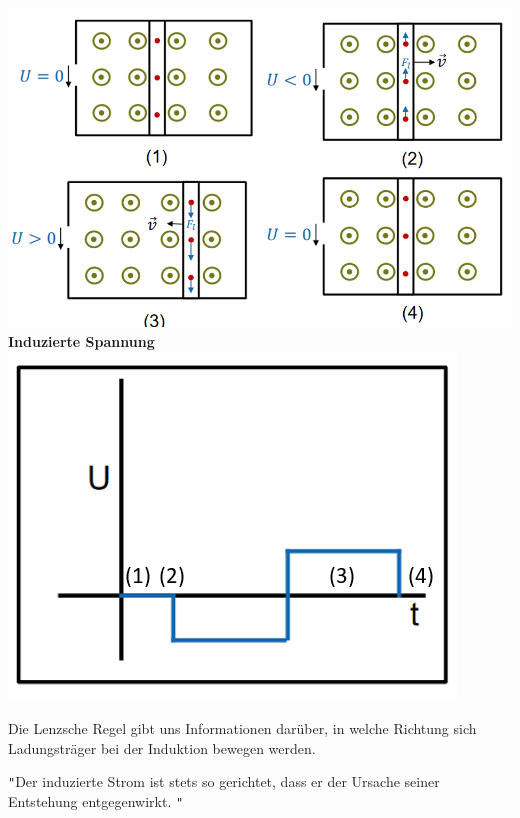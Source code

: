 \begin{center}
  \includegraphics[scale=0.4]{img/beweg-ind} \\
  \textbf{Induzierte Spannung} \\
    \includegraphics[scale=0.4]{img/beweg-ind-graph}
\end{center}



Die Lenzsche Regel gibt uns Informationen darüber, in welche Richtung sich Ladungsträger bei der Induktion bewegen werden.
\beginip
\begin{center}
  \texttt{"}Der induzierte Strom ist stets so gerichtet, dass er der Ursache seiner Entstehung entgegenwirkt.  \texttt{"}
\end{center}
\iend
\newpage

